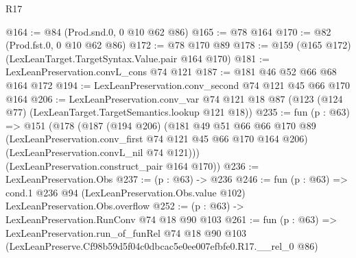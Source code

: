 \begin{lexlean}{R17}
\begin{coremodule}
@164 := @84 (Prod.snd.{0, 0} @10 @62 @86)
@165 := @78 @164
@170 := @82 (Prod.fst.{0, 0} @10 @62 @86)
@172 := @78 @170 @89
@178 := @159 (@165 @172) (LexLeanTarget.TargetSyntax.Value.pair @164 @170)
@181 := LexLeanPreservation.convL_cons @74 @121
@187 := @181 @46 @52 @66 @68 @164 @172
@194 := LexLeanPreservation.conv_second @74 @121 @45 @66 @170 @164
@206 := LexLeanPreservation.conv_var
    @74
    @121
    @18
    @87
    (@123 (@124 @77) (LexLeanTarget.TargetSemantics.lookup @121 @18))
@235 := fun (p : @63) =>
  @151
    (@178
      (@187
        (@194 @206)
        (@181
          @49
          @51
          @66
          @66
          @170
          @89
          (LexLeanPreservation.conv_first @74 @121 @45 @66 @170 @164 @206)
          (LexLeanPreservation.convL_nil @74 @121)))
      (LexLeanPreservation.construct_pair @164 @170))
@236 := LexLeanPreservation.Obs
@237 := (p : @63) -> @236
@246 := fun (p : @63) =>
  cond.{1} @236 @94 (LexLeanPreservation.Obs.value @102) LexLeanPreservation.Obs.overflow
@252 := (p : @63) -> LexLeanPreservation.RunConv @74 @18 @90 @103
@261 := fun (p : @63) =>
  LexLeanPreservation.run_of_funRel
    @74
    @18
    @90
    @103
    (LexLeanPreserve.Cf98b59d5f04c0dbcac5e0ee007efbfe0.R17.__rel_0 @86)
\end{coremodule}
\end{lexlean}
